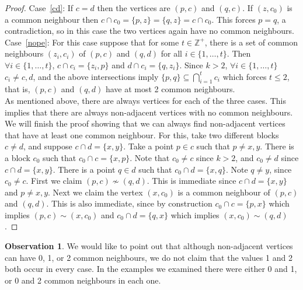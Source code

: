 \documentclass[letterpaper,10pt]{article}
\theoremstyle{plain}
\theoremstyle{definition}
\newtheorem{ob}{Observation}
\begin{document}
\begin{proof}
    Case~\ref{cd}: If $c=d$ then the vertices are $(p,c)$ and $(q,c)$. If $(z,c_0)$ is a common neighbour then $c\cap c_0=\{p,z\}=\{q,z\}=c\cap c_0$. This forces $p=q$, a contradiction, so in this case the two vertices again have no common neighbours.\\

    Case~\ref{nope}: For this case suppose that for some $t\in\mathbb{Z}^+$, there is a set of common neighbours $(z_i,c_i)$ of $(p,c)$ and $(q,d)$ for all $i\in\{1,\ldots, t\}$. Then $\forall i\in\{1,\ldots, t\}$, $c\cap c_i=\{z_i,p\}$ and $d\cap c_i=\{q,z_i\}$. Since $k>2$, $\forall i\in\{1,\ldots, t\}$ $c_i\neq c,d$, and the above intersections imply $ \{p,q\}\subseteq \displaystyle \bigcap_{i=1}^tc_i$ which forces $t\leq 2$, that is, $(p,c)$ and $(q,d)$ have at most 2 common neighbours.\\

    As mentioned above, there are always vertices for each of the three cases. This implies that there are always non-adjacent vertices with no common neighbours. We will finish the proof showing that we can always find non-adjacent vertices that have at least one common neighbour. For this, take two different blocks $c\neq d$, and suppose $c\cap d=\{x,y\}$. Take a point $p\in c$ such that $p\neq x,y$. There is a block $c_0$ such that $c_0\cap c=\{x,p\}$. Note that $c_0\neq c$ since $k>2$, and $c_0\neq d$ since $c\cap d=\{x,y\}$. There is a point $q\in d$ such that $c_0\cap d=\{x,q\}$. Note $q\neq y$, since $c_0\neq c$. First we claim $(p,c)\nsim (q,d)$. This is immediate since $c\cap d=\{x,y\}$ and $p\neq x,y$. Next we claim the vertex $(x,c_0)$ is a common neighbour of $(p,c)$ and $(q,d)$. This is also immediate, since by construction $c_0\cap c=\{p,x\}$ which implies $(p,c)\sim(x,c_0)$ and $c_0\cap d=\{q,x\}$ which implies $(x,c_0)\sim(q,d)$. 
\end{proof}

\begin{ob}
    We would like to point out that although non-adjacent vertices can have 0, 1, or 2 common neighbours, we do not claim that the values 1 and 2 both occur in every case. In the examples we examined there were either 0 and 1, or 0 and 2 common neighbours in each one.
\end{ob}
\end{document}
